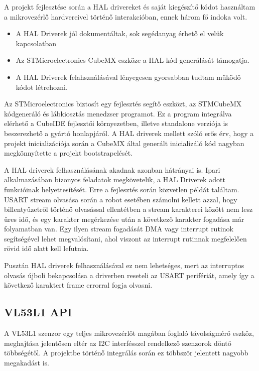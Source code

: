 A projekt fejlesztése során a HAL drivereket és saját kiegészítő kódot használtam
a mikrovezérlő hardvereivel történő interakcióban, ennek három fő indoka volt.

\begin{itemize}
\item{A HAL Driverek jól dokumentáltak, sok segédanyag érhető el velük
  kapcsolatban}
\item{Az STMicroelectronics CubeMX eszköze a HAL kód generálását támogatja.}
\item{A HAL Driverek felahsználásával lényegesen gyorsabban tudtam működő kódot
  létrehozni.}
\end{itemize}

Az STMicroelectronics biztosít egy fejlesztés segítő eszközt, az STMCubeMX
kódgeneráló és lábkiosztás menedzser programot. Ez a program integrálva elérhető
a CubeIDE fejlesztői környezetben, illetve standalone verziója is beszerezhető a
gyártó honlapjáról. A HAL driverek mellett szóló erős érv, hogy a projekt
inicializációja során a CubeMX által generált inicializáló kód nagyban
megkönnyítette a projekt bootstrapelését.

\medskip

A HAL driverek felhasználásának akadnak azonban hátrányai is. Ipari
alkalmazásában bizonyos feladatok megkövetelik, a HAL Driverek adott funkcióinak
helyettesítését. Erre a fejlesztés során közvetlen példát találtam.  USART stream
olvasása során a robot esetében számolni kellett azzal, hogy billentyűzetről
történő olvasással ellentétben a stream karakterei között nem lesz üres idő, és
egy karakter megérkezése után a következő karakter fogadása már folyamatban
van. Egy ilyen stream fogadását DMA vagy interrupt rutinok segítségével lehet
megvalósítani, ahol viszont az interrupt rutinnak megfelelően rövid idő alatt
kell lefutnia.

Pusztán HAL driverek felhasználásával ez nem lehetséges, mert az interruptos
olvasás újboli bekapcsolása a driverben reseteli az USART perifériát, amely így a
következő karaktert frame errorral fogja olvasni.

\subsection{VL53L1 API}

A VL53L1 szenzor egy teljes mikrovezérlőt magában foglaló távolságmérő eszköz,
meghajtása jelentősen eltér az I2C interfésszel rendelkező szenzorok döntő
többségétől. A projektbe történő integrálás során ez többször jelentett nagyobb
megakadást is.

